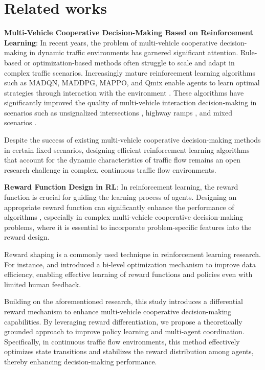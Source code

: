 \section{Related works}
\textbf{Multi-Vehicle Cooperative Decision-Making Based on Reinforcement Learning}:
In recent years, the problem of multi-vehicle cooperative decision-making in dynamic traffic environments has garnered significant attention. Rule-based or optimization-based methods often struggle to scale and adapt in complex traffic scenarios. Increasingly mature reinforcement learning algorithms such as MADQN, MADDPG, MAPPO, and Qmix enable agents to learn optimal strategies through interaction with the environment \cite{wang2024research}. These algorithms have significantly improved the quality of multi-vehicle interaction decision-making in scenarios such as unsignalized intersections \cite{zhuang2023cooperative, HADDAD2022105019, li2020deep, 10417752}, highway ramps \cite{10643142, 10159552, zhao2023multi}, and mixed scenarios \cite{louati2024sustainable, 10123696}.

Despite the success of existing multi-vehicle cooperative decision-making methods in certain fixed scenarios, designing efficient reinforcement learning algorithms that account for the dynamic characteristics of traffic flow remains an open research challenge in complex, continuous traffic flow environments.

\textbf{Reward Function Design in RL}:
In reinforcement learning, the reward function is crucial for guiding the learning process of agents. Designing an appropriate reward function can significantly enhance the performance of algorithms \cite{eschmann2021reward, icarte2022reward}, especially in complex multi-vehicle cooperative decision-making problems, where it is essential to incorporate problem-specific features into the reward design.

Reward shaping is a commonly used technique in reinforcement learning research. For instance, \cite{naik2024reward} and \cite{liu2022meta} introduced a bi-level optimization mechanism to improve data efficiency, enabling effective learning of reward functions and policies even with limited human feedback.

Building on the aforementioned research, this study introduces a differential reward mechanism to enhance multi-vehicle cooperative decision-making capabilities. By leveraging reward differentiation, we propose a theoretically grounded approach to improve policy learning and multi-agent coordination. Specifically, in continuous traffic flow environments, this method effectively optimizes state transitions and stabilizes the reward distribution among agents, thereby enhancing decision-making performance.